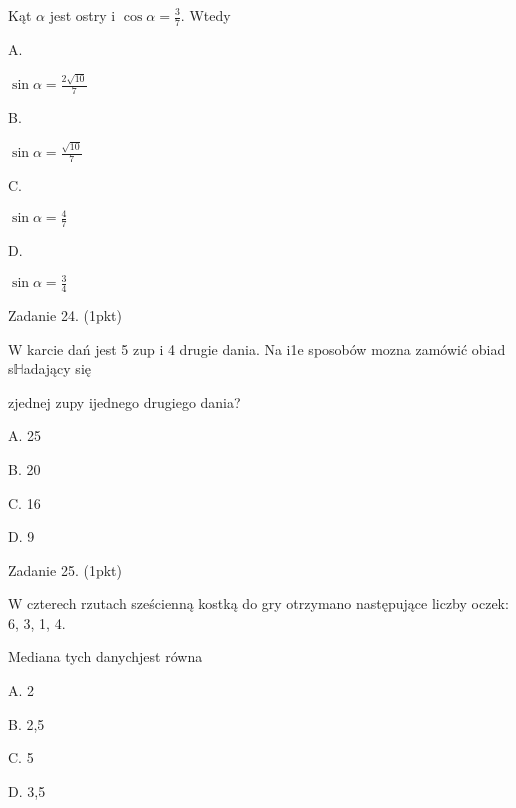 \documentclass[a4paper,12pt]{article}
\begin{document}
Kąt $\alpha$ jest ostry i $\displaystyle \cos\alpha=\frac{3}{7}$. Wtedy

A.

$\displaystyle \sin\alpha=\frac{2\sqrt{10}}{7}$

B.

$\displaystyle \sin\alpha=\frac{\sqrt{10}}{7}$

C.

$\displaystyle \sin\alpha=\frac{4}{7}$

D.

$\displaystyle \sin\alpha=\frac{3}{4}$

Zadanie 24. (1pkt)

W karcie dań jest 5 zup i 4 drugie dania. Na i1e sposobów mozna zamówić obiad s$\mathbb{H}$adający się

zjednej zupy ijednego drugiego dania?

A. 25

B. 20

C. 16

D. 9

Zadanie 25. (1pkt)

W czterech rzutach sześcienną kostką do gry otrzymano następujące liczby oczek: 6, 3, 1, 4.

Mediana tych danychjest równa

A. 2

B. 2,5

C. 5

D. 3,5
\end{document}
